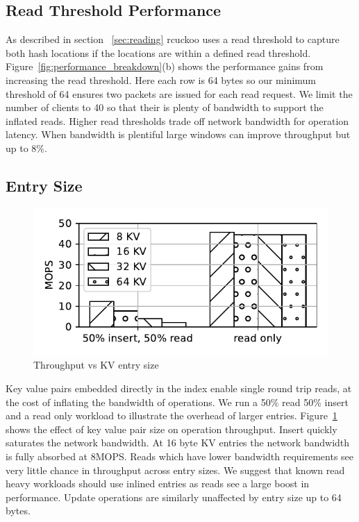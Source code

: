 \subsection{Read Threshold Performance}
\label{sec:read_threshold}
As described in section ~\ref{sec:reading} rcuckoo uses a
read threshold to capture both hash locations if the
locations are within a defined read threshold.
Figure~\ref{fig:performance_breakdown}(b) shows the
performance gains from increasing the read threshold. Here
each row is 64 bytes so our minimum threshold of 64 ensures
two packets are issued for each read request. We limit the
number of clients to 40 so that their is plenty of bandwidth
to support the inflated reads. Higher read thresholds trade
off network bandwidth for operation latency. When bandwidth
is plentiful large windows can improve throughput but up to
8\%.



\subsection{Entry Size}
\begin{figure}[ht]
    \includegraphics[width=0.99\linewidth]{fig/entry_size.pdf}
    \caption{Throughput vs KV entry size}
    \label{fig:entry_size}
\end{figure}

Key value pairs embedded directly in the index enable single
round trip reads, at the cost of inflating the bandwidth of
operations. We run a 50\% read 50\% insert and a read only
workload to illustrate the overhead of larger entries.
Figure~\ref{fig:entry_size} shows the effect of key value
pair size on operation throughput. Insert quickly saturates
the network bandwidth. At 16 byte KV entries the network
bandwidth is fully absorbed at 8MOPS. Reads which have lower
bandwidth requirements see very little chance in throughput
across entry sizes. We suggest that known read heavy
workloads should use inlined entries as reads see a large
boost in performance. Update operations are similarly
unaffected by entry size up to 64 bytes. 

